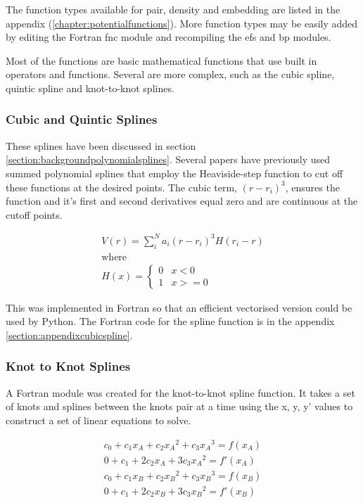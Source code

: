 The function types available for pair, density and embedding are listed in the appendix (\ref{chapter:potentialfunctions}).  More function types may be easily added by editing the Fortran fnc module and recompiling the efs and bp modules.

Most of the functions are basic mathematical functions that use built in operators and functions.  Several are more complex, such as the cubic spline, quintic spline and knot-to-knot splines.


\subsubsection{Cubic and Quintic Splines}

These splines have been discussed in section \ref{section:backgroundpolynomialsplines}.  Several papers have previously used summed polynomial splines that employ the Heaviside-step function to cut off these functions at the desired points.  The cubic term, $(r - r_i)^3$, ensures the function and it's first and second derivatives equal zero and are continuous at the cutoff points.  

\begin{equation}
\begin{split}
V(r) = \sum_i^N a_i (r - r_i)^3 H(r_i - r) \\
\text{where } \\
H(x) = \left\{ \begin{matrix} 0 & x<0 \\  1 & x >= 0 \end{matrix} \right . 
\end{split}
\label{eq:cubicSpline}
\end{equation}

This was implemented in Fortran so that an efficient vectorised version could be used by Python.  The Fortran code for the spline function is in the appendix \ref{section:appendixcubicspline}.


\subsubsection{Knot to Knot Splines}

A Fortran module was created for the knot-to-knot spline function.  It takes a set of knots and splines between the knots pair at a time using the x, y, y' values to construct a set of linear equations to solve. 

\begin{equation}
  \begin{split}
    c_0 + c_1 x_A + c_2 {x_A}^2 + c_3 {x_A}^3 = f(x_A) \\
    0 + c_1 + 2 c_2 {x_A} + 3 c_3 {x_A}^2 = f'(x_A) \\
    c_0 + c_1 x_B + c_2 {x_B}^2 + c_3 {x_B}^3 = f(x_B) \\
    0 + c_1 + 2 c_2 {x_B} + 3 c_3 {x_B}^2 = f'(x_B) 
  \end{split}
  \label{eq:eqSplineThreeEquations}
\end{equation}


